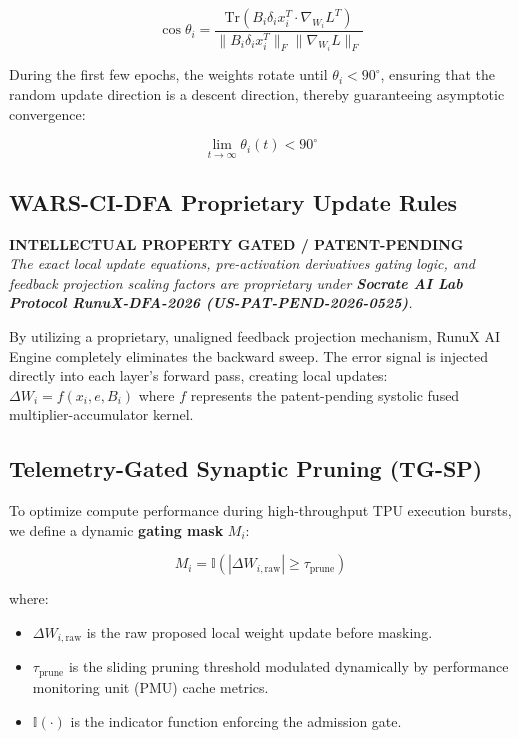 \documentclass[10pt,journal,compsoc]{IEEEtran}
\begin{document}
\begin{equation}
\cos \theta_i = \frac{\text{Tr}(B_i \delta_i x_i^T \cdot \nabla_{W_i} L^T)}{\|B_i \delta_i x_i^T\|_F \|\nabla_{W_i} L\|_F}
\end{equation}

During the first few epochs, the weights rotate until $\theta_i < 90^\circ$, ensuring that the random update direction is a descent direction, thereby guaranteeing asymptotic convergence:

\begin{equation}
\lim_{t \to \infty} \theta_i(t) < 90^\circ
\end{equation}

\subsection{WARS-CI-DFA Proprietary Update Rules}
\begin{IEEEoverridecommandlockouts}
\textbf{INTELLECTUAL PROPERTY GATED / PATENT-PENDING} \\
\textit{The exact local update equations, pre-activation derivatives gating logic, and feedback projection scaling factors are proprietary under \textbf{Socrate AI Lab Protocol RunuX-DFA-2026 (US-PAT-PEND-2026-0525)}.}

By utilizing a proprietary, unaligned feedback projection mechanism, RunuX AI Engine completely eliminates the backward sweep. The error signal is injected directly into each layer's forward pass, creating local updates: $\Delta W_i = f(x_i, e, B_i)$ where $f$ represents the patent-pending systolic fused multiplier-accumulator kernel.
\end{IEEEoverridecommandlockouts}

\subsection{Telemetry-Gated Synaptic Pruning (TG-SP)}
To optimize compute performance during high-throughput TPU execution bursts, we define a dynamic \textbf{gating mask} $M_i$:

\begin{equation}
M_i = \mathbb{I}(|\Delta W_{i,\text{raw}}| \ge \tau_{\text{prune}})
\end{equation}

where:
\begin{itemize}
\item $\Delta W_{i,\text{raw}}$ is the raw proposed local weight update before masking.
\item $\tau_{\text{prune}}$ is the sliding pruning threshold modulated dynamically by performance monitoring unit (PMU) cache metrics.
\item $\mathbb{I}(\cdot)$ is the indicator function enforcing the admission gate.
\end{itemize}
\end{document}
